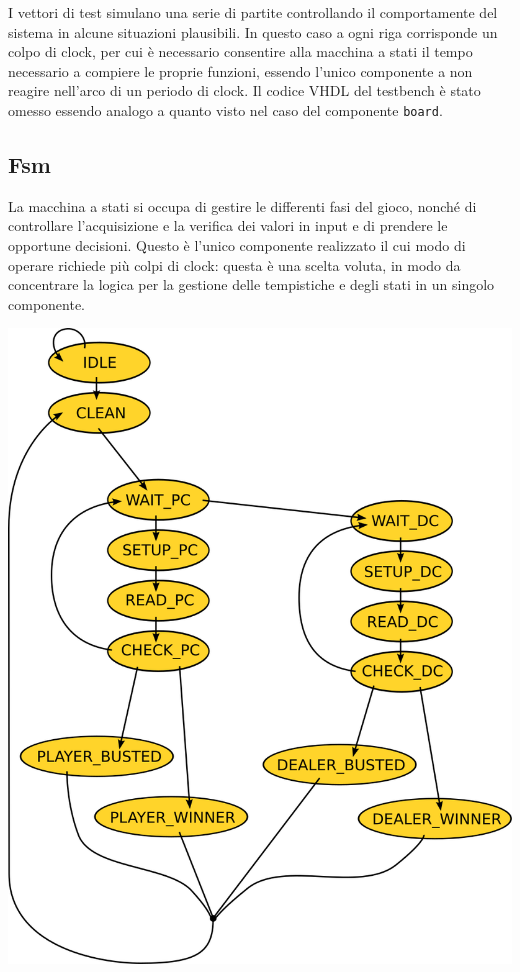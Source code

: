 \documentclass [11pt,a4paper,oneside]{article}
\newcommand{\component}[1]{\texttt{#1}}
\begin{document}


I vettori di test simulano una serie di partite controllando il 
comportamente del sistema in alcune situazioni plausibili.
In questo caso a ogni riga corrisponde un colpo di clock, per cui
è necessario consentire alla macchina a stati il tempo necessario
a compiere le proprie funzioni, essendo l'unico componente a non
reagire nell'arco di un periodo di clock. Il codice VHDL del 
testbench è stato omesso essendo analogo a quanto visto nel caso del
componente \component{board}.

\subsection{Fsm}

La macchina a stati si occupa di gestire le differenti fasi del gioco,
nonché di controllare l'acquisizione e la verifica dei valori in input
e di prendere le opportune decisioni. Questo è l'unico componente
realizzato il cui modo di operare richiede più colpi di clock: questa
è una scelta voluta, in modo da concentrare la logica per la gestione
delle tempistiche e degli stati in un singolo componente.

\bigskip
\begin{center}
\includegraphics{fsm}
\end{center}
\bigskip
\end{document}
